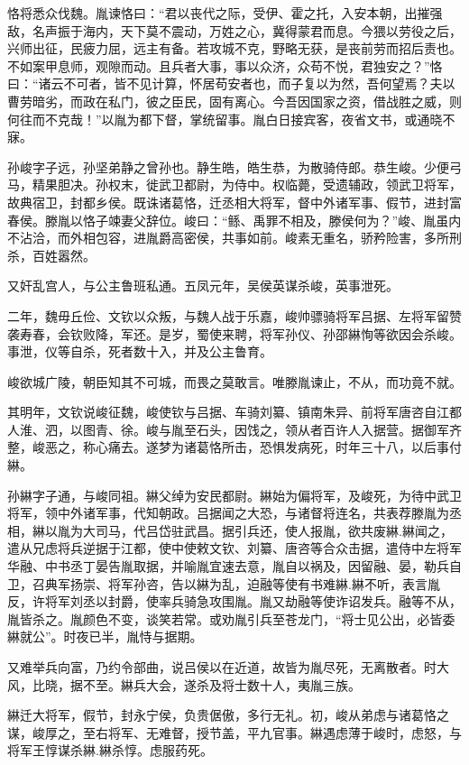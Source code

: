 \documentclass[12pt,UTF8]{ctexbook}
\begin{document}
恪将悉众伐魏。胤谏恪曰：“君以丧代之际，受伊、霍之托，入安本朝，出摧强敌，名声振于海内，天下莫不震动，万姓之心，冀得蒙君而息。今猥以劳役之后，兴师出征，民疲力屈，远主有备。若攻城不克，野略无获，是丧前劳而招后责也。不如案甲息师，观隙而动。且兵者大事，事以众济，众苟不悦，君独安之？”恪曰：“诸云不可者，皆不见计算，怀居苟安者也，而子复以为然，吾何望焉？夫以曹劳暗劣，而政在私门，彼之臣民，固有离心。今吾因国家之资，借战胜之威，则何往而不克哉！”以胤为都下督，掌统留事。胤白日接宾客，夜省文书，或通晓不寐。

孙峻字子远，孙坚弟静之曾孙也。静生皓，皓生恭，为散骑侍郎。恭生峻。少便弓马，精果胆决。孙权末，徙武卫都尉，为侍中。权临薨，受遗辅政，领武卫将军，故典宿卫，封都乡侯。既诛诸葛恪，迁丞相大将军，督中外诸军事、假节，进封富春侯。滕胤以恪子竦妻父辞位。峻曰：“鲧、禹罪不相及，滕侯何为？”峻、胤虽内不沾洽，而外相包容，进胤爵高密侯，共事如前。峻素无重名，骄矜险害，多所刑杀，百姓嚣然。

又奸乱宫人，与公主鲁班私通。五凤元年，吴侯英谋杀峻，英事泄死。

二年，魏毋丘俭、文钦以众叛，与魏人战于乐嘉，峻帅骠骑将军吕据、左将军留赞袭寿春，会钦败降，军还。是岁，蜀使来聘，将军孙仪、孙邵綝恂等欲因会杀峻。事泄，仪等自杀，死者数十入，并及公主鲁育。

峻欲城广陵，朝臣知其不可城，而畏之莫敢言。唯滕胤谏止，不从，而功竟不就。

其明年，文钦说峻征魏，峻使钦与吕据、车骑刘纂、镇南朱异、前将军唐咨自江都人淮、泗，以图青、徐。峻与胤至石头，因饯之，领从者百许人入据营。据御军齐整，峻恶之，称心痛去。遂梦为诸葛恪所击，恐惧发病死，时年三十八，以后事付綝。

孙綝字子通，与峻同祖。綝父绰为安民都尉。綝始为偏将军，及峻死，为待中武卫将军，领中外诸军事，代知朝政。吕据闻之大恐，与诸督将连名，共表荐滕胤为丞相，綝以胤为大司马，代吕岱驻武昌。据引兵还，使人报胤，欲共废綝.綝闻之，遣从兄虑将兵逆据于江都，使中使敕文钦、刘纂、唐咨等合众击据，遣侍中左将军华融、中书丞丁晏告胤取据，并喻胤宜速去意，胤自以祸及，因留融、晏，勒兵自卫，召典军扬崇、将军孙咨，告以綝为乱，迫融等使有书难綝.綝不听，表言胤反，许将军刘丞以封爵，使率兵骑急攻围胤。胤又劫融等使诈诏发兵。融等不从，胤皆杀之。胤颜色不变，谈笑若常。或劝胤引兵至苍龙门，“将士见公出，必皆委綝就公”。时夜已半，胤恃与据期。

又难举兵向富，乃约令部曲，说吕侯以在近道，故皆为胤尽死，无离散者。时大风，比晓，据不至。綝兵大会，遂杀及将士数十人，夷胤三族。

綝迁大将军，假节，封永宁侯，负贵倨傲，多行无礼。初，峻从弟虑与诸葛恪之谋，峻厚之，至右将军、无难督，授节盖，平九官事。綝遇虑薄于峻时，虑怒，与将军王惇谋杀綝.綝杀惇。虑服药死。
\end{document}
